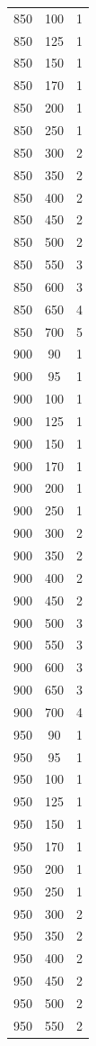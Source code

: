 \begin{longtable}{c c c}
850 & 100 & 1 \\
850 & 125 & 1 \\
850 & 150 & 1 \\
850 & 170 & 1 \\
850 & 200 & 1 \\
850 & 250 & 1 \\
850 & 300 & 2 \\
850 & 350 & 2 \\
850 & 400 & 2 \\
850 & 450 & 2 \\
850 & 500 & 2 \\
850 & 550 & 3 \\
850 & 600 & 3 \\
850 & 650 & 4 \\
850 & 700 & 5 \\
900 & 90 & 1 \\
900 & 95 & 1 \\
900 & 100 & 1 \\
900 & 125 & 1 \\
900 & 150 & 1 \\
900 & 170 & 1 \\
900 & 200 & 1 \\
900 & 250 & 1 \\
900 & 300 & 2 \\
900 & 350 & 2 \\
900 & 400 & 2 \\
900 & 450 & 2 \\
900 & 500 & 3 \\
900 & 550 & 3 \\
900 & 600 & 3 \\
900 & 650 & 3 \\
900 & 700 & 4 \\
950 & 90 & 1 \\
950 & 95 & 1 \\
950 & 100 & 1 \\
950 & 125 & 1 \\
950 & 150 & 1 \\
950 & 170 & 1 \\
950 & 200 & 1 \\
950 & 250 & 1 \\
950 & 300 & 2 \\
950 & 350 & 2 \\
950 & 400 & 2 \\
950 & 450 & 2 \\
950 & 500 & 2 \\
950 & 550 & 2 \\

\end{longtable}
